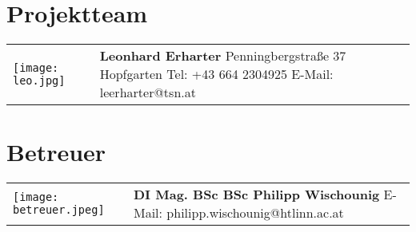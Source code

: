 \section*{Projektteam}
\label{proteam}

\begin{tabular}[t]{p{2cm} p{5cm}}
    \vspace{0pt}
    \texttt{[image: leo.jpg]}
    &
    \vspace{0pt}
    \textbf{Leonhard Erharter} 
    \newline Penningbergstraße 37
    \newline 6361 Hopfgarten
    \newline
    \newline Tel: +43 664 2304925
    \newline E-Mail: leerharter@tsn.at
    \\
\end{tabular}

\section*{Betreuer}

\begin{tabular}[t]{p{2cm} p{5cm}}
    \vspace{0pt}
    \texttt{[image: betreuer.jpeg]}
    &
    \vspace{0pt}
    \textbf{DI Mag. BSc BSc Philipp Wischounig}
    \newline
    \newline E-Mail: 
    \newline philipp.wischounig@htlinn.ac.at
    \\
\end{tabular} 

\newpage